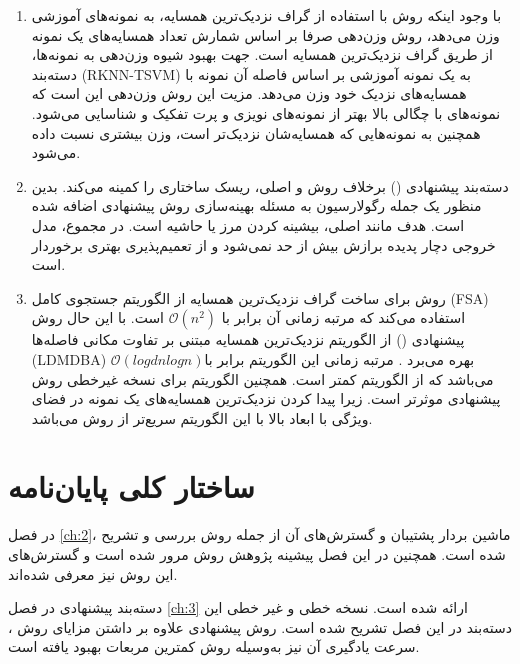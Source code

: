 \begin{enumerate}
	\item با وجود اینکه روش  با استفاده از گراف نزدیک‌ترین همسایه، به نمونه‌های آموزشی وزن می‌دهد، روش وزن‌دهی صرفا بر اساس شمارش تعداد همسایه‌های یک نمونه از طریق گراف نزدیک‌ترین همسایه است.  جهت بهبود شیوه وزن‌دهی به نمونه‌ها، دسته‌بند  (\gls*{RKNN-TSVM}) به یک نمونه آموزشی بر اساس فاصله آن نمونه با همسایه‌های نزدیک خود وزن می‌دهد. مزیت این روش وزن‌دهی این است که نمونه‌های با چگالی بالا بهتر از نمونه‌های نویزی و پرت تفکیک و شناسایی می‌شود. همچنین به نمونه‌هایی که همسایه‌شان نزدیک‌تر است، وزن بیشتری نسبت داده می‌شود.
	
	\item دسته‌بند پیشنهادی () برخلاف روش  و  اصلی، ریسک ساختاری را کمینه می‌کند. بدین منظور یک جمله رگولارسیون به مسئله بهینه‌سازی روش پیشنهادی اضافه شده است. هدف مانند  اصلی، بیشینه کردن مرز یا حاشیه است. در مجموع، مدل خروجی دچار پدیده برازش بیش از حد نمی‌شود و از تعمیم‌پذیری بهتری برخوردار است.
	
	\item روش  برای ساخت گراف نزدیک‌ترین همسایه از الگوریتم جستجوی کامل  (\gls{FSA}) استفاده می‌کند که مرتبه زمانی آن برابر با $\mathcal{O}(n^{2})$ است. با این حال روش پیشنهادی () از الگوریتم نزدیک‌ترین همسایه مبتنی بر تفاوت مکانی فاصله‌ها (\gls{LDMDBA}) بهره می‌برد \cite{xia2015}. مرتبه زمانی این الگوریتم برابر با$\mathcal{O}(log d n log n)$  می‌باشد که از الگوریتم  کمتر است. همچنین الگوریتم  برای نسخه غیرخطی روش پیشنهادی موثرتر است. زیرا پیدا کردن نزدیک‌ترین همسایه‌های یک نمونه در فضای ویژگی با ابعاد بالا با این الگوریتم سریع‌تر از روش  می‌باشد.
	
\end{enumerate}

\section{ساختار کلی  پایان‌نامه}\label{sec:1:4}
در فصل \ref{ch:2}، ماشین بردار پشتیبان و گسترش‌های آن از جمله روش  بررسی و تشریح شده است. همچنین در این فصل پیشینه پژوهش روش   مرور شده است و گسترش‌های این روش نیز معرفی شده‌اند.

دسته‌بند پیشنهادی  در فصل \ref{ch:3} ارائه شده است.  نسخه خطی و غیر خطی این دسته‌بند در این فصل تشریح شده است. روش پیشنهادی علاوه بر داشتن مزایای روش   ، سرعت یادگیری آن نیز به‌وسیله روش کمترین مربعات بهبود یافته است.


